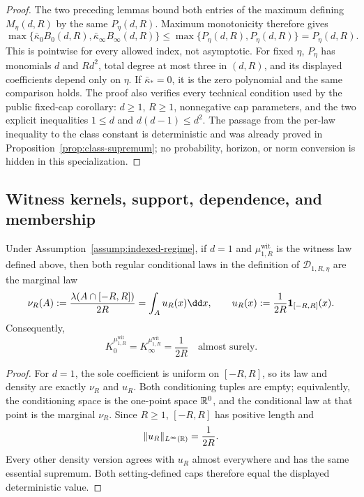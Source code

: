 \begin{proof}
The two preceding lemmas bound both entries of the maximum defining
$M_\eta(d,R)$ by the same $P_\eta(d,R)$.  Maximum monotonicity therefore
gives
\[
\max\{\bar\kappa_0B_0(d,R),\bar\kappa_\infty B_\infty(d,R)\}
\leq\max\{P_\eta(d,R),P_\eta(d,R)\}=P_\eta(d,R).
\]
This is pointwise for every allowed index, not asymptotic.  For fixed $\eta$,
$P_\eta$ has monomials $d$ and $Rd^2$, total degree at most three in
$(d,R)$, and its displayed coefficients depend only on $\eta$.  If
$\bar\kappa_*=0$, it is the zero polynomial and the same comparison holds.
The proof also verifies every technical condition used by the public
fixed-cap corollary: $d\geq1$, $R\geq1$, nonnegative cap parameters, and the
two explicit inequalities $1\leq d$ and $d(d-1)\leq d^2$.  The passage from
the per-law inequality to the class constant is deterministic and was
already proved in Proposition~\ref{prop:class-supremum}; no probability,
horizon, or norm conversion is hidden in this specialization.
\end{proof}

\subsection{Witness kernels, support, dependence, and membership}
\label{app:witness}

\begin{proposition}
\label{prop:degree-one-witness-kernels}
Under Assumption~\ref{assump:indexed-regime}, if $d=1$ and
$\mu^{\mathrm{wit}}_{1,R}$ is the witness law defined above, then both
regular conditional laws in the definition of
$\mathcal D_{1,R,\eta}$ are the marginal law
\[
\nu_R(A):=\frac{\lambda(A\cap[-R,R])}{2R}
=\int_Au_R(x)\dd x,
\qquad
u_R(x):=\frac1{2R}\1_{[-R,R]}(x).
\]
Consequently,
\[
K_0^{\mu^{\mathrm{wit}}_{1,R}}
=K_\infty^{\mu^{\mathrm{wit}}_{1,R}}
=\frac1{2R}
\quad\text{almost surely}.
\]
\end{proposition}

\begin{proof}
For $d=1$, the sole coefficient is uniform on $[-R,R]$, so its law and
density are exactly $\nu_R$ and $u_R$.  Both conditioning tuples are empty;
equivalently, the conditioning space is the one-point space $\mathbb{R}^0$, and the
conditional law at that point is the marginal $\nu_R$.  Since $R\geq1$,
$[-R,R]$ has positive length and
\[
\|u_R\|_{L^\infty(\mathbb{R})}=\frac1{2R}.
\]
Every other density version agrees with $u_R$ almost everywhere and has the
same essential supremum.  Both setting-defined caps therefore equal the
displayed deterministic value.
\end{proof}


